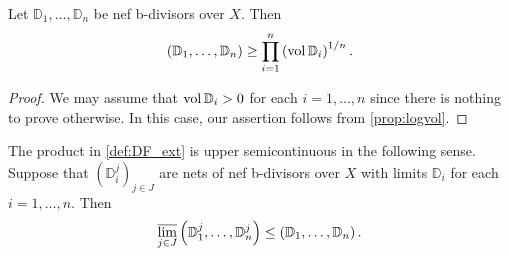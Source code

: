 \begin{proposition}\label{prop:bdiv:L692}
    Let $\mathbb{D}_1,\ldots,\mathbb{D}_n$ be nef b-divisors over $X$. Then
    \[
    \left(\mathbb{D}_1,\ldots,\mathbb{D}_n \right)\geq \prod_{i=1}^n \left( \operatorname{vol} \mathbb{D}_i\right)^{1/n}.
    \]
\end{proposition}
\begin{proof}
    We may assume that $\operatorname{vol} \mathbb{D}_i>0$ for each $i=1,\ldots,n$ since there is nothing to prove otherwise. In this case, our assertion follows from \cref{prop:logvol}.
\end{proof}

\begin{proposition}\label{prop:DFusc}
    The product in \cref{def:DF_ext} is upper semicontinuous in the following sense. Suppose that $(\mathbb{D}_i^j)_{j\in J}$ are nets of nef b-divisors over $X$ with limits $\mathbb{D}_i$ for each $i=1,\ldots,n$. Then
    \begin{equation}\label{eq:limsupint_prod}
    \varlimsup_{j\in J}\left(\mathbb{D}_1^j,\ldots,\mathbb{D}_n^j \right)\leq  \left( \mathbb{D}_1,\ldots,\mathbb{D}_n \right).
    \end{equation}
\end{proposition}
